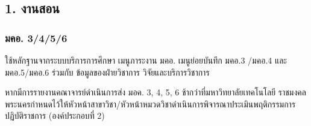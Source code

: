 \documentclass[a4paper,12pt,english]{sphinxmanual}
\begin{document}
\subsection{1. งานสอน}
\label{\detokenize{submission_part1:id3}}

\subsubsection{มคอ. 3/4/5/6}
\label{\detokenize{submission_part1:id4}}
ใช้หลักฐานจากระบบบริการการศึกษา เมนูภาระงาน มคอ. เมนูย่อยบันทึก มคอ.3 /มคอ.4  และ มคอ.5/มคอ.6 ร่วมกับ ข้อมูลของฝ่ายวิชาการ วิจัยและบริการวิชาการ

หากมีการรายงานคณาจารย์ดำเนินการส่ง มอค. 3, 4, 5, 6 ช้ากว่าที่มหาวิทยาลัยเทคโนโลยี
ราชมงคลพระนครกำหนดไว้ให้หัวหน้าสาขาวิชา/หัวหน้าหมวดวิชาดำเนินการพิจารณาประเมินพฤติกรรมการปฏิบัติราชการ (องค์ประกอบที่ 2)
\end{document}
